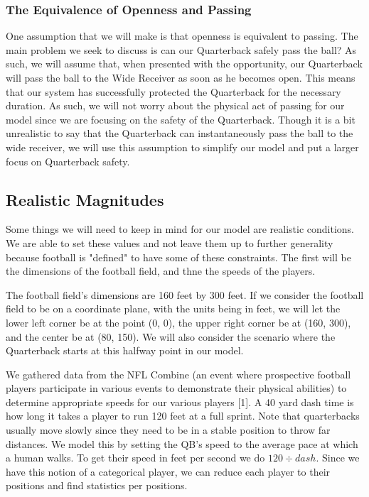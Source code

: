 \subsubsection{The Equivalence of Openness and Passing}

\quad One assumption that we will make is that openness is equivalent to passing. The main problem we seek to discuss is can our Quarterback safely pass the ball? As such, we will assume that, when presented with the opportunity, our Quarterback will pass the ball to the Wide Receiver as soon as he becomes open. This means that our system has successfully protected the Quarterback for the necessary duration. As such, we will not worry about the physical act of passing for our model since we are focusing on the safety of the Quarterback. Though it is a bit unrealistic to say that the Quarterback can instantaneously pass the ball to the wide receiver, we will use this assumption to simplify our model and put a larger focus on Quarterback safety. 


\subsection{Realistic Magnitudes}

\quad Some things we will need to keep in mind for our model are realistic conditions. We are able to set these values and not leave them up to further generality because football is "defined" to have some of these constraints. The first will be the dimensions of the football field, and thne the speeds of the players.

The football field’s dimensions are 160 feet by 300 feet. If we consider the football field to be on a coordinate plane, with the units being in feet, we will let the lower left corner be at the point (0, 0), the upper right corner be at (160, 300), and the center be at (80, 150). We will also consider the scenario where the Quarterback starts at this halfway point in our model.

We gathered data from the NFL Combine (an event where prospective football players participate in various events to demonstrate their physical abilities) to determine appropriate speeds for our various players [1]. A 40 yard dash time is how long it takes a player to run 120 feet at a full sprint. Note that quarterbacks usually move slowly since they need to be in a stable position to throw far distances. We model this by setting the QB's speed to the average pace at which a human walks. To get their speed in feet per second we do $120 \div dash$. Since we have this notion of a categorical player, we can reduce each player to their positions and find statistics per positions. 

